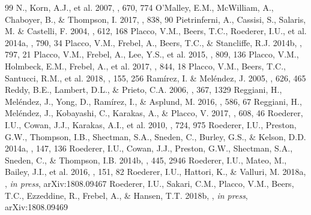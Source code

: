 \documentclass[preprint]{aastex61}
\begin{document}
{\begin{thebibliography}{99}
  N., Korn, A.J., et al. 2007, \apj, 670, 774
 O'Malley, E.M.,
  McWilliam, A., Chaboyer, B., \& Thompson, I. 2017, \apj, 838, 90
 Pietrinferni, A.,
Cassisi, S., Salaris, M. \& Castelli, F. 2004, \apj, 612, 168 
 Placco, V.M., Beers,
  T.C., Roederer, I.U., et al. 2014a, \apj, 790, 34
 Placco, V.M., Frebel, A.,
  Beers, T.C., \& Stancliffe, R.J. 2014b, \apj, 797, 21
 Placco, V.M., Frebel, A.,
  Lee, Y.S., et al. 2015, \apj, 809, 136
 Placco, V.M., Holmbeck,
  E.M., Frebel, A., et al. 2017, \apj, 844, 18
 Placco, V.M., Beers, T.C.,
  Santucci, R.M., et al. 2018, \apj, 155, 256
  Ram\'{i}rez, I. \& Mel\'{e}ndez, J. 2005, \apj, 626, 465
 Reddy, B.E., Lambert, D.L.,
\& Prieto, C.A. 2006, \mnras, 367, 1329
 Reggiani, H.,
  Mel\'{e}ndez, J., Yong, D., Ram\'{i}rez, I., \& Asplund, M. 2016,
  \aap, 586, 67
 Reggiani, H.,
  Mel\'{e}ndez, J., Kobayashi, C., Karakas, A., \& Placco, V. 2017,
  \aap, 608, 46
 Roederer, I.U., Cowan,
  J.J., Karakas, A.I., et al. 2010, \apj, 724, 975
 Roederer, I.U.,
  Preston, G.W., Thompson, I.B., Shectman, S.A., Sneden, C., Burley,
  G.S., \& Kelson, D.D. 2014a, \aj, 147, 136
 Roederer, I.U.,
  Cowan, J.J., Preston, G.W., Shectman, S.A., Sneden, C., \& Thompson,
  I.B. 2014b, \mnras, 445, 2946
 Roederer, I.U., Mateo,
  M., Bailey, J.I., et  al. 2016, \aj, 151, 82
 Roederer, I.U.,
  Hattori, K., \& Valluri, M. 2018a, \aj, {\it in press},
  arXiv:1808.09467
 Roederer, I.U.,
  Sakari, C.M., Placco, V.M., Beers, T.C., Ezzeddine, R., Frebel, A.,
  \& Hansen, T.T. 2018b, \apj, {\it in press}, arXiv:1808.09469

\end{thebibliography}}
\end{document}
